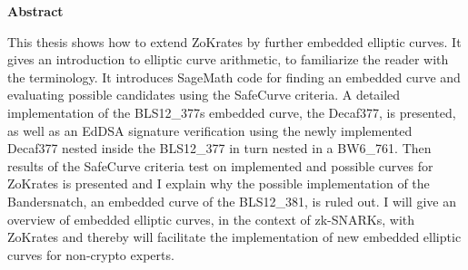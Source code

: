 \thispagestyle{empty}
\vspace*{1.0cm}

\begin{center}
    \textbf{Abstract}
\end{center}

\vspace*{0.5cm}

\noindent

This thesis shows how to extend ZoKrates by further embedded elliptic curves. It gives an introduction to elliptic curve arithmetic, to familiarize the reader with the terminology. It introduces SageMath code for finding an embedded curve and evaluating possible candidates using the SafeCurve criteria. A detailed implementation of the BLS12\_377s embedded curve, the Decaf377, is presented, as well as an EdDSA signature verification using the newly implemented Decaf377 nested inside the BLS12\_377 in turn nested in a BW6\_761. Then results of the SafeCurve criteria test on implemented and possible curves for ZoKrates is presented and I explain why the possible implementation of the Bandersnatch, an embedded curve of the BLS12\_381, is ruled out. I will give an overview of embedded elliptic curves, in the context of zk-SNARKs, with ZoKrates and thereby will facilitate the implementation of new embedded elliptic curves for non-crypto experts.
